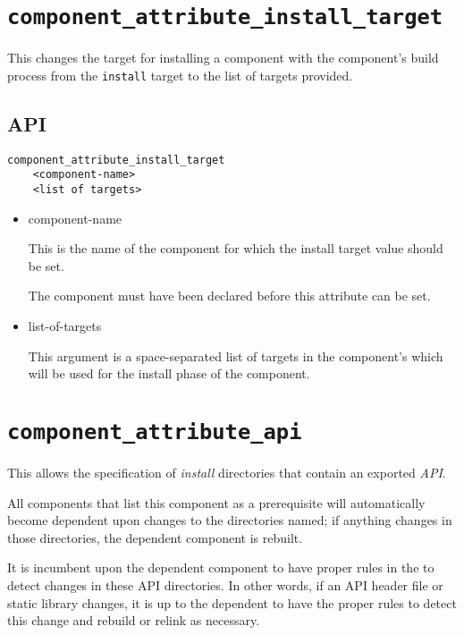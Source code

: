 \section{\texttt{component\_attribute\_install\_target}}\label{api:install-target}

This changes the target for installing a component with the
component's build process from the \texttt{install} \make target to
the list of targets provided.

\subsection{API}

\begin{verbatim}
component_attribute_install_target
    <component-name>
    <list of targets>
\end{verbatim}

\begin{itemize}
\item component-name

  This is the name of the component for which the install target value
  should be set.

  The component must have been declared before this attribute can be
  set.

\item list-of-targets

  This argument is a space-separated list of targets in the
  component's \makefile which will be used for the install phase of
  the component.
\end{itemize}

\section{\texttt{component\_attribute\_api}}\label{api:api}

This allows the specification of \emph{install} directories that
contain an exported \emph{API}.

All components that list this component as a prerequisite will
automatically become dependent upon changes to the directories named;
if anything changes in those directories, the dependent component is
rebuilt.

It is incumbent upon the dependent component to have proper rules in
the \makefile to detect changes in these API directories.  In other
words, if an API header file or static library changes, it is up to
the dependent \makefile to have the proper rules to detect this change
and rebuild or relink as necessary.

